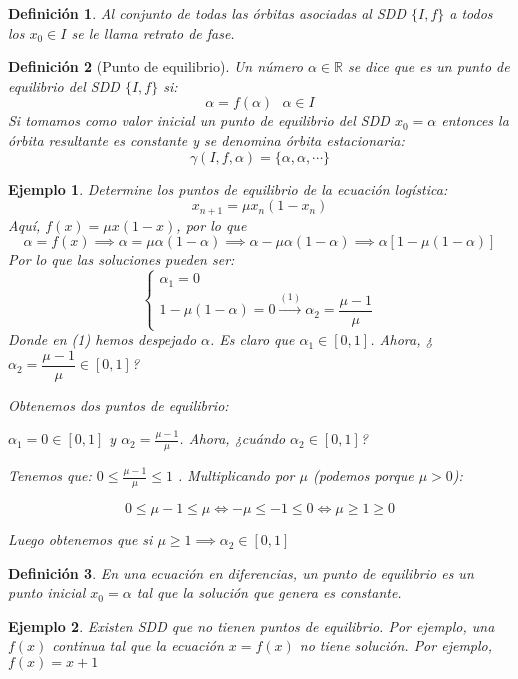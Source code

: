\documentclass[11pt, a4paper, titlepage]{article}
\newcommand{\R}{\mathbb{R}}
\theoremstyle{theorem-style}
\theoremstyle{definition-style}
\newtheorem*{ndef}{Definición}
\theoremstyle{remark-style}
\theoremstyle{example-style}
\newtheorem*{ejemplo}{Ejemplo}
\begin{document}
\begin{ndef}
	Al conjunto de todas las órbitas asociadas al SDD $\{I,f\}$  a todos los $x_0 \in I$ se le llama retrato de fase.
\end{ndef}

\begin{ndef}[Punto de equilibrio]
	Un número $\alpha \in \R$ se dice que es un punto de equilibrio del SDD $\{I,f\}$ si:
	\[
	\alpha = f(\alpha) \ \ \ \alpha \in I
	\]
	Si tomamos como valor inicial un punto de equilibrio del SDD $x_0 = \alpha$ entonces la órbita resultante es constante y se denomina órbita estacionaria:
	\[
	\gamma(I,f,\alpha) = \{\alpha, \alpha, \cdots\}
	\]
\end{ndef}
\begin{ejemplo}
	Determine los puntos de equilibrio de la ecuación logística:
	\[
	x_{n+1} = \mu x_n(1-x_n)
	\]
	Aquí, $f(x) = \mu x(1-x)$, por lo que
	 \[
	\alpha = f(x) \implies \alpha = \mu \alpha (1-\alpha) \implies \alpha - \mu \alpha(1-\alpha) \implies \alpha[1-\mu(1-\alpha)]
	\]
	Por lo que las soluciones pueden ser:
	\[
	\begin{cases}
	\alpha_1 = 0\\
	1-\mu(1-\alpha) = 0 \xrightarrow{(1)} \alpha_2 = \dfrac{\mu -1}{\mu}
\end{cases}
	\]
	Donde en (1) hemos despejado $\alpha$. Es claro que $\alpha_1 \in [0,1]$. Ahora, ¿$\alpha_2=  \dfrac{\mu -1}{\mu} \in [0,1] $?
	

	Obtenemos dos puntos de equilibrio:

	$ \alpha_{1} = 0 \in [0,1] $ y $ \alpha_{2}= \frac{\mu - 1}{\mu} $. Ahora, ¿cuándo $\alpha_2\in [0,1] $?

	Tenemos que: $ 0 \leq \frac{\mu - 1}{\mu} \leq 1 $ . Multiplicando por $\mu$ (podemos porque $\mu > 0$):

	$$ 0 \leq \mu - 1 \leq \mu \Leftrightarrow -\mu \leq -1 \leq 0 \Leftrightarrow \mu \geq 1 \geq 0 $$

	Luego obtenemos que si $\mu \geq 1 \implies \alpha_{2} \in [0,1] $

\end{ejemplo}

\begin{ndef}
	En una ecuación en diferencias, un punto de equilibrio es un punto inicial $x_0= \alpha$ tal que la solución que genera es constante.
\end{ndef}

\begin{ejemplo}
	Existen SDD que no tienen puntos de equilibrio. Por ejemplo, una $f(x)$ continua tal que la ecuación $x = f(x)$ no tiene solución. Por ejemplo, $f(x) = x+1$
\end{ejemplo}
\end{document}
